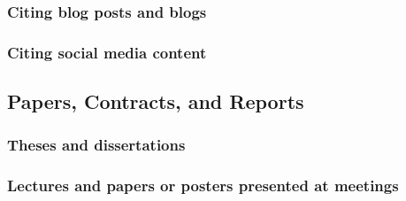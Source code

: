 \documentclass[11pt,letterpaper,oneside]{article}
\begin{document}
\setcounter{subsubsection}{207}
\subsubsection{Citing blog posts and blogs}

\begin{citebib}
\item \cite{amlen2015}
\item \cite{germano2017}
\item \cite{amlen}
\item \cite{linguafranca}
\item \cite{jim2017}
\end{citebib}

\subsubsection{Citing social media content}

\begin{citebib}
\item \cite{diaz2016}
\item \cite{obrien2015}
\item \cite{chicago2015}
\item \cite{licis2016}
\end{citebib}

\setcounter{subsection}{7}
\subsection{Papers, Contracts, and Reports}
\setcounter{subsection}{14}

\setcounter{subsubsection}{214}
\subsubsection{Theses and dissertations}

\begin{citebib}
\item \cite[59]{vedrashko2006}
\item \cite{choi2008}
\end{citebib}

\setcounter{subsubsection}{216}
\subsubsection{Lectures and papers or posters presented at meetings}
\end{document}
